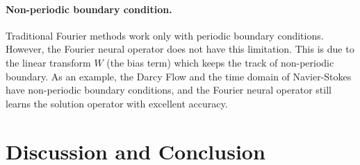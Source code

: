\documentclass{article} %
\begin{document}
\paragraph{Non-periodic boundary condition.} Traditional Fourier methods work only with periodic boundary conditions. However, the Fourier neural operator does not have this limitation. This is due to the linear transform $W$ (the bias term) which keeps the track of non-periodic boundary. As an example, the Darcy Flow and the time domain of Navier-Stokes have non-periodic boundary conditions, and the Fourier neural operator still learns the solution operator with excellent accuracy.

\section{Discussion and Conclusion}
\end{document}
